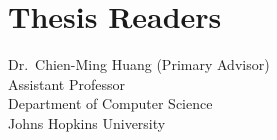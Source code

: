 \section*{Thesis Readers}
\begin{singlespace}
%
\noindent Dr.~Chien-Ming Huang (Primary Advisor)\\
\indent \indent Assistant Professor\\
\indent \indent Department of Computer Science\\
\indent \indent Johns Hopkins University\\


%
%
\end{singlespace}